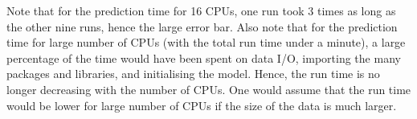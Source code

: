 \documentclass[a4paper,12pt]{article}
\begin{document}
Note that for the prediction time for 16 CPUs, one run took 3 times as long as the other nine runs, hence the large error bar. Also note that for the prediction time for large number of CPUs (with the total run time under a minute), a large percentage of the time would have been spent on data I/O, importing the many packages and libraries, and initialising the model. Hence, the run time is no longer decreasing with the number of CPUs. One would assume that the run time would be lower for large number of CPUs if the size of the data is much larger. 


%
%


\end{document}
